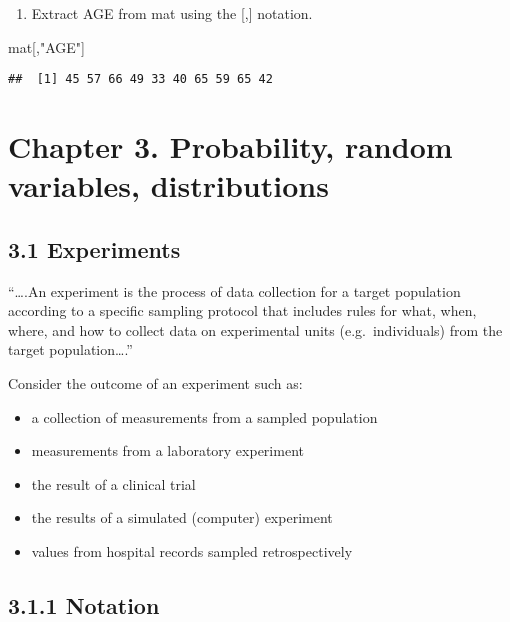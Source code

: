 \documentclass[]{article}
\newenvironment{Shaded}{\begin{snugshade}}{\end{snugshade}}
\newcommand{\NormalTok}[1]{#1}
\newcommand{\StringTok}[1]{\textcolor[rgb]{0.31,0.60,0.02}{#1}}
\providecommand{\tightlist}{%
  \setlength{\itemsep}{0pt}\setlength{\parskip}{0pt}}
\begin{document}
\begin{enumerate}
\def\labelenumi{\alph{enumi}.}
\setcounter{enumi}{3}
\tightlist
\item
  Extract AGE from mat using the {[},{]} notation.
\end{enumerate}

\begin{Shaded}
\begin{Highlighting}[]
\NormalTok{mat[,}\StringTok{"AGE"}\NormalTok{]}
\end{Highlighting}
\end{Shaded}

\begin{verbatim}
##  [1] 45 57 66 49 33 40 65 59 65 42
\end{verbatim}

\hypertarget{chapter-3.-probability-random-variables-distributions}{%
\section{Chapter 3. Probability, random variables,
distributions}\label{chapter-3.-probability-random-variables-distributions}}

\hypertarget{experiments}{%
\subsection{3.1 Experiments}\label{experiments}}

``\ldots{}.An experiment is the process of data collection for a target
population according to a specific sampling protocol that includes rules
for what, when, where, and how to collect data on experimental units
(e.g.~individuals) from the target population\ldots{}.''

Consider the outcome of an experiment such as:

\begin{itemize}
\tightlist
\item
  a collection of measurements from a sampled population
\item
  measurements from a laboratory experiment
\item
  the result of a clinical trial
\item
  the results of a simulated (computer) experiment
\item
  values from hospital records sampled retrospectively
\end{itemize}

\hypertarget{notation}{%
\subsection{3.1.1 Notation}\label{notation}}
\end{document}
